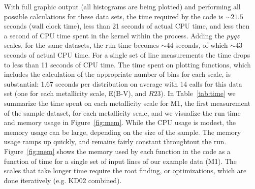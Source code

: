 \documentclass{emulateapj}
\begin{document}
With full graphic output (all histograms are being plotted) and performing all possible calculations for these data sets, the time required by the code is $\sim21.5$ seconds (wall clock time), less than 21 seconds of actual CPU time, and less then a second of CPU time spent in the kernel within the process. Adding the \emph{pyqz} scales, for the same datasets, the run time becomes $\sim44$ seconds, of which $\sim43$ seconds of actual CPU time. For a single set of line measurements the time drops to less than 11 seconds of CPU time. 
The time spent on plotting functions, which includes the calculation of the appropriate number of bins for each scale, is substantial: 1.67 seconds per distribution  on average with 14 calls for this data set (one for each metallicity scale, E(B-V), and $R23$). In Table~\ref{tab:time}  we summarize the time spent on each metallicity scale for M1, the first  measurement of the sample dataset, for each metallicity scale, and we visualize the run time and memory usage in Figure~\ref{fig:mem}. While the CPU usage is modest, the memory usage can be large, depending on the size of the sample.  The memory usage ramps up quickly, and remains fairly constant throughtout the run.  Figure~\ref{fig:mem} shows the memory used by each function in the code as a function of time for a single set of input lines of our example data (M1). The scales that take longer time require the root finding, or optimizations, which are done iteratively (e.g. KD02 combined).
\end{document}

